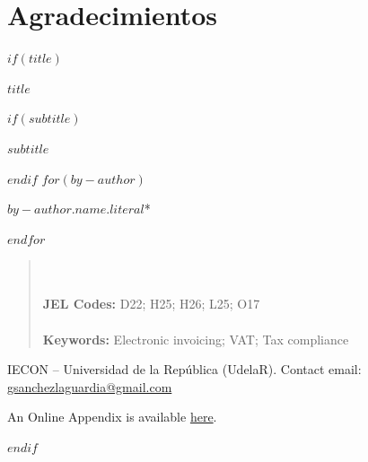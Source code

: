 \section*{Agradecimientos}
\thispagestyle{empty}

$if(title)$
\cleardoublepage
\thispagestyle{empty}
{\centering
{\huge\bfseries $title$ \par}
$if(subtitle)$
\vspace{1ex}
{\Large\bfseries $subtitle$ \par}
$endif$
\vspace{3ex}
$for(by-author)$
{\large $by-author.name.literal$*\par}
$endfor$
\vspace{3ex}
}
{\begin{quote}
{\footnotesize
\onehalfspacing

\vspace{1ex}
\\~\\
\textbf{JEL Codes:} D22; H25; H26; L25; O17 \\~\\
\textbf{Keywords:} Electronic invoicing; VAT; Tax compliance
}
\end{quote}\par}
{\vfill}
{\footnotesize * IECON -- Universidad de la República (UdelaR). 
Contact email: \href{mailto:gsanchezlaguardia@gmail.com}{gsanchezlaguardia@gmail.com} \par}
{\footnotesize An Online Appendix is available \href{https://www.dropbox.com/s/8dp2z62gf3w5jkf/Online-appendix.pdf?st=lp7mjeeh&dl=0}{here}.}
{\small\par}
$endif$
